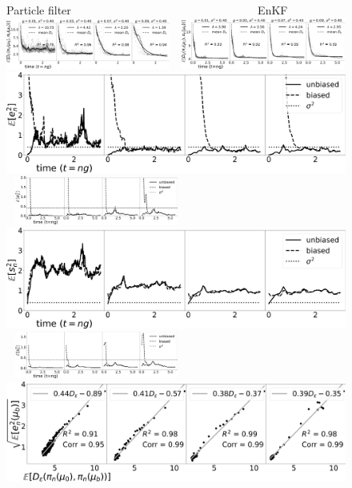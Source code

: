\begin{figure}[t!]
\centering
Particle filter $\qquad \qquad \qquad \qquad \qquad \qquad \qquad \qquad $ EnKF\\
    \includegraphics[width=0.48\textwidth]{probing-nfs/plots/plots-bpf-effect of obs gap-rate_obs_gap_all.jpg} $\ \ $
    \includegraphics[width=0.48\textwidth]{probing-nfs/plots/plots-enkf-effect of ob gap-rate_all.jpg}\\
   \includegraphics[width=0.48\columnwidth]{probing-nfs/plots/plots-bpf-effect of obs gap-l2_obs_gap_all.jpg} $\ \ $
    \includegraphics[width=0.48\textwidth]{probing-nfs/plots/plots-enkf-effect of ob gap-mean_l2error_all.jpg}\\
   \includegraphics[width=0.48\columnwidth]{probing-nfs/plots/plots-bpf-effect of obs gap-trace_obs_gap_all.jpg} $\ \ $
    \includegraphics[width=0.48\textwidth]{probing-nfs/plots/plots-enkf-effect of ob gap-mean_trace_all.jpg}\\
   \includegraphics[width=0.48\columnwidth]{probing-nfs/plots/plots-bpf-effect of obs gap-dvl2_obs_gap_all.jpg} $\ \ $

\end{figure}

